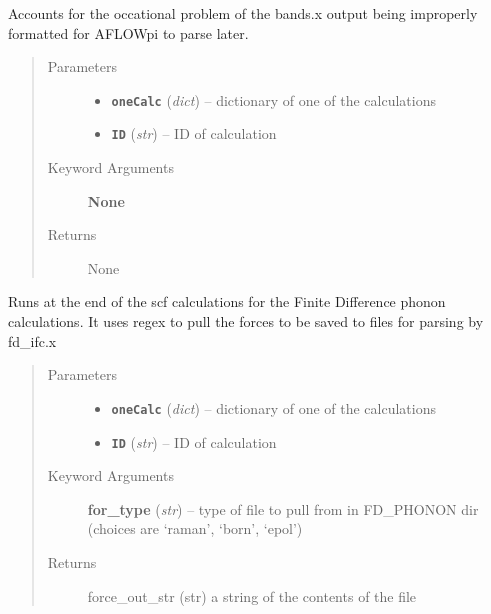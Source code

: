 \documentclass[letterpaper,10pt,english]{sphinxmanual}
\begin{document}
\begin{fulllineitems}
\label{run:run.__PW_bands_fix}
Accounts for the occational problem of the bands.x output being
improperly formatted for AFLOWpi to parse later.
\begin{quote}\begin{description}
\item[{Parameters}] \leavevmode\begin{itemize}
\item {} 
\textbf{\texttt{oneCalc}} (\emph{dict}) -- dictionary of one of the calculations

\item {} 
\textbf{\texttt{ID}} (\emph{str}) -- ID of calculation

\end{itemize}

\item[{Keyword Arguments}] \leavevmode
\textbf{None}

\item[{Returns}] \leavevmode
None

\end{description}\end{quote}

\end{fulllineitems}


\begin{fulllineitems}
\label{run:run.__collect_fd_field_forces}
Runs at the end of the scf calculations for the Finite Difference phonon
calculations. It uses regex to pull the forces to be saved to files for
parsing by fd\_ifc.x
\begin{quote}\begin{description}
\item[{Parameters}] \leavevmode\begin{itemize}
\item {} 
\textbf{\texttt{oneCalc}} (\emph{dict}) -- dictionary of one of the calculations

\item {} 
\textbf{\texttt{ID}} (\emph{str}) -- ID of calculation

\end{itemize}

\item[{Keyword Arguments}] \leavevmode
\textbf{for\_type} (\emph{str}) --
type of file to pull from in FD\_PHONON dir (choices are `raman', `born', `epol')

\item[{Returns}] \leavevmode
force\_out\_str (str) a string of the contents of the file

\end{description}\end{quote}

\end{fulllineitems}
\end{document}
